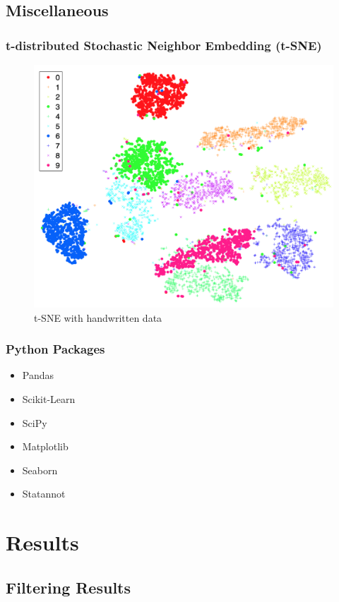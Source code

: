 \documentclass{beamer}
\begin{document}
    \subsection{Miscellaneous}
    \begin{frame}
        \frametitle{t-distributed Stochastic Neighbor Embedding (t-SNE)}

        \begin{figure}
            \includegraphics[width=0.6 \linewidth]{figures/tsne.png}
            \caption{t-SNE with handwritten data \protect\cite{tsne1}}
        \end{figure}
    \end{frame}

    \begin{frame}
        \frametitle{Python Packages}

        \begin{itemize}
            \item Pandas \cite{pandas1}
            \item Scikit-Learn \cite{sklearn1}
            \item SciPy \cite{scipy1}
            \item Matplotlib \cite{matplotlib1}
            \item Seaborn \cite{seaborn1}
            \item Statannot
        \end{itemize}
    \end{frame}

    \section{Results}
    \subsection{Filtering Results}
\end{document}
